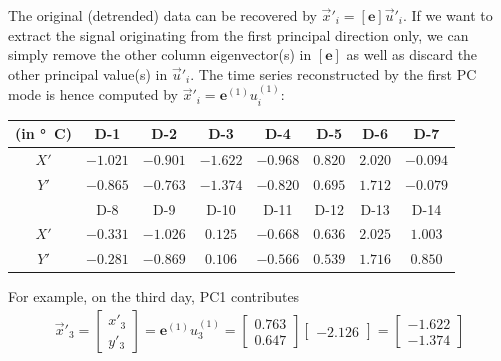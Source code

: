 \begin{solution}
The original (detrended) data can be recovered by $\vec{x}'_i = [\textbf{e}]\vec{u}'_i$. If we want to extract the signal originating from the first principal direction only, we can simply remove the other column eigenvector(s) in $[\textbf{e}]$ as well as discard the other principal value(s) in $\vec{u}'_i$. The time series reconstructed by the first PC mode is hence computed by $\vec{x}'_i = \textbf{e}^{(1)}u_i^{(1)}$:
\begin{center}
\begin{tabular}{|c|c|c|c|c|c|c|c|}
\hline
(in \si{\degree C}) & D-1 & D-2 & D-3 & D-4 & D-5 & D-6 & D-7 \\
\hline
$X'$ & $-1.021$ & $-0.901$ & $-1.622$ & $-0.968$ & $0.820$ & $2.020$ & $-0.094$ \\
\hline
$Y'$ & $-0.865$ & $-0.763$ & $-1.374$ & $-0.820$ & $0.695$ & $1.712$ & $-0.079$ \\
\hline
 & D-8 & D-9 & D-10 & D-11 & D-12 & D-13 & D-14 \\
\hline
$X'$ & $-0.331$ & $-1.026$ & $0.125$ & $-0.668$ & $0.636$ & $2.025$ & $1.003$ \\
\hline
$Y'$ & $-0.281$ & $-0.869$ & $0.106$ & $-0.566$ & $0.539$ & $1.716$ & $0.850$ \\
\hline
\end{tabular}
\end{center}
For example, on the third day, PC1 contributes
\begin{align*}
\vec{x}'_3 =
\begin{bmatrix}
x'_3 \\
y'_3
\end{bmatrix}
=
\textbf{e}^{(1)}u_3^{(1)}
=
\begin{bmatrix}
0.763 \\
0.647
\end{bmatrix}
\begin{bmatrix}
-2.126
\end{bmatrix}
=
\begin{bmatrix}
-1.622 \\
-1.374  
\end{bmatrix}
\end{align*}
\end{solution}
